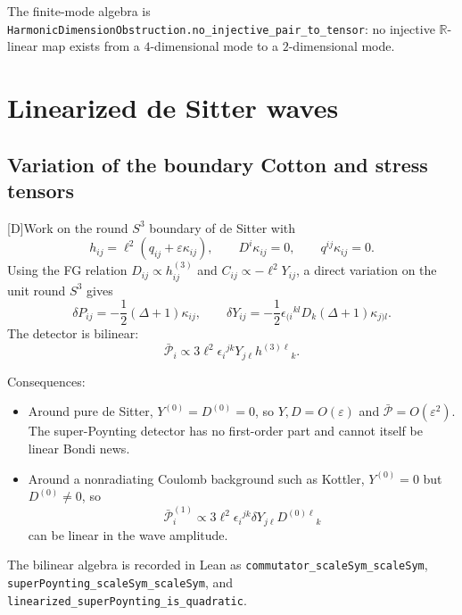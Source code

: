\documentclass[11pt,a4paper]{article}
\newcommand{\cP}{\mathcal{P}}
\newcommand{\statusD}{\textsf{[D]}}
\begin{document}
The finite-mode algebra is \texttt{HarmonicDimensionObstruction.no\_injective\_pair\_to\_tensor}: no injective \(\mathbb R\)-linear map exists from a \(4\)-dimensional mode to a \(2\)-dimensional mode.

\section{Linearized de Sitter waves}

\subsection{Variation of the boundary Cotton and stress tensors}

\statusD Work on the round \(S^3\) boundary of de Sitter with
\begin{equation}
  h_{ij}=\ell^2(q_{ij}+\varepsilon\kappa_{ij}),
  \qquad
  D^i\kappa_{ij}=0,
  \qquad
  q^{ij}\kappa_{ij}=0 .
\end{equation}
Using the FG relation \(D_{ij}\propto h^{(3)}_{ij}\) and \(C_{ij}\propto -\ell^2Y_{ij}\), a direct variation on the unit round \(S^3\) gives
\begin{equation}
  \delta P_{ij}
  =
  -\frac12(\Delta+1)\kappa_{ij},
  \qquad
  \delta Y_{ij}
  =
  -\frac12
  \epsilon_{(i}{}^{kl}
  D_k(\Delta+1)\kappa_{j)l}.
\end{equation}
The detector is bilinear:
\begin{equation}\label{eq:detector-bilinear}
  \bar{\cP}_i
  \propto
  3\ell^2
  \epsilon_i{}^{jk}
  Y_{j\ell}h^{(3)\ell}{}_k .
\end{equation}

Consequences:
\begin{itemize}
  \item Around pure de Sitter, \(Y^{(0)}=D^{(0)}=0\), so \(Y,D=O(\varepsilon)\) and \(\bar{\cP}=O(\varepsilon^2)\).  The super-Poynting detector has no first-order part and cannot itself be linear Bondi news.
  \item Around a nonradiating Coulomb background such as Kottler, \(Y^{(0)}=0\) but \(D^{(0)}\neq0\), so
  \begin{equation}
    \bar{\cP}^{(1)}_i
    \propto
    3\ell^2
    \epsilon_i{}^{jk}
    \delta Y_{j\ell}D^{(0)\ell}{}_k
  \end{equation}
  can be linear in the wave amplitude.
\end{itemize}
The bilinear algebra is recorded in Lean as \texttt{commutator\_scaleSym\_scaleSym}, \texttt{superPoynting\_scaleSym\_scaleSym}, and \texttt{linearized\_superPoynting\_is\_quadratic}.
\end{document}
